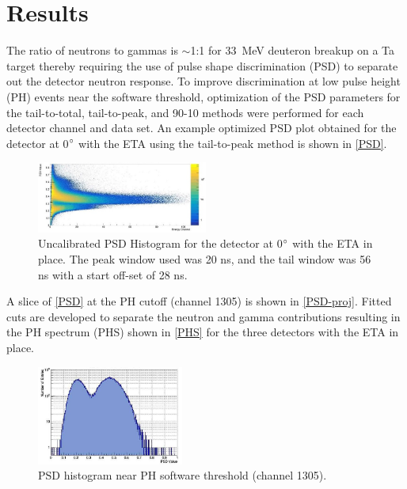 \documentclass[twocolumn,10pt,final]{asme2ej}
\begin{document}
\vspace{-0.4 cm}
\section{Results} \label{sec:results}
The ratio of neutrons to gammas is $\sim$1:1 for 33~MeV deuteron breakup on a Ta target thereby requiring the use of pulse shape discrimination (PSD) to separate out the detector neutron response.
To improve discrimination at low pulse height (PH) events near the software threshold, optimization of the PSD parameters for the tail-to-total, tail-to-peak, and 90-10 methods were performed for each detector channel and data set.  
An example optimized PSD plot obtained for the detector at 0$\degree$ with the ETA using the tail-to-peak method is shown in \autoref{PSD}. 

\vspace{-0.5 cm}
\begin{figure} [htp!]
 \centering
 \includegraphics[trim = 0cm 0cm 0cm 0cm, clip, width=0.5\textwidth]{../Figs/psd.jpg}
   \caption{Uncalibrated PSD Histogram for the detector at 0$\degree$ with the ETA in place. The peak window used was 20 ns, and the tail window was 56 ns with a start off-set of 28 ns.}
  \label{PSD}
\vspace{-0.4 cm}
\end{figure}

A slice of \autoref{PSD} at the PH cutoff (channel 1305) is shown in \autoref{PSD-proj}.
Fitted cuts are developed to separate the neutron and gamma contributions resulting in the PH spectrum (PHS) shown in \autoref{PHS} for the three detectors with the ETA in place.

\vspace{-0.5 cm}
\begin{figure} [htp!]
 \centering
 \includegraphics[trim = 0cm 0cm 0cm 0cm, clip, width=0.43\textwidth]{../Figs/psd-proj.jpg}
   \caption{PSD histogram near PH software threshold (channel 1305).}
  \label{PSD-proj}
\vspace{-0.4 cm}
\end{figure}
\end{document}
